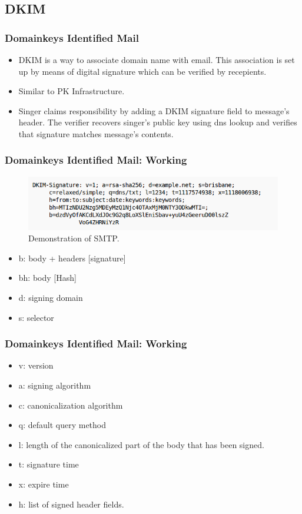 \documentclass{beamer}
\begin{document}
\subsection{DKIM}
\begin{frame}
  \frametitle{Domainkeys Identified Mail}
  \begin{itemize}
    \item DKIM is a way to associate domain name with email. This association is set up by means of digital signature which can be verified by recepients.
    \item Similar to PK Infrastructure.
    \item Singer claims responsibility by adding a DKIM signature field to message's header. The verifier recovers singer's public key using dns lookup and verifies that signature matches message's contents. 
  \end{itemize}
\end{frame}
\begin{frame}
  \frametitle{Domainkeys Identified Mail: Working}
  \begin{figure}[h]
    \includegraphics[scale = 0.35]{dkim.png}
    \caption{Demonstration of SMTP.}
    \centering
  \end{figure}
  \begin{itemize}
    \item b: body + headers [signature]
    \item bh: body [Hash]
    \item d: signing domain
    \item s: selector
%      
  \end{itemize}

\end{frame}
\begin{frame}
  \frametitle{Domainkeys Identified Mail: Working}
  \begin{itemize}
    \item v: version
    \item a: signing algorithm 
    \item c: canonicalization algorithm
    \item q: default query method
    \item l: length of the canonicalized part of the body that has been signed.
    \item t: signature time
    \item x: expire time
    \item h: list of signed header fields.
  \end{itemize}
\end{frame}
\end{document}
